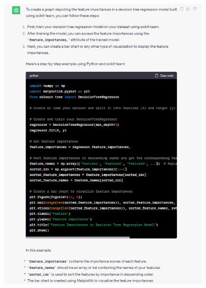 \documentclass{article}
\begin{document}
\begin{titlepage}
\begin{center}
\includegraphics[width=0.8\textwidth]{4.png}
\end{center}


\end{titlepage}
\end{document}
